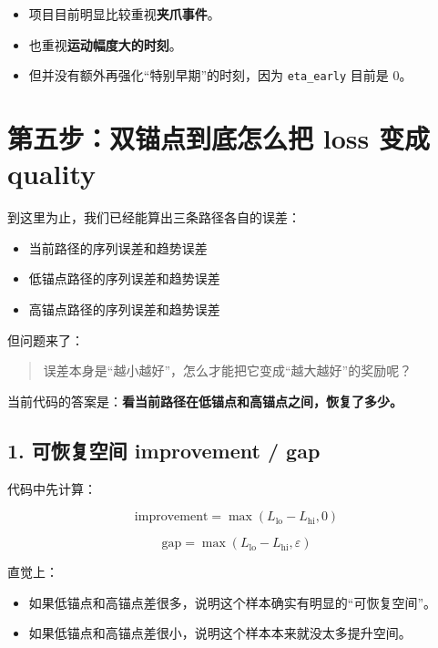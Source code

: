 \documentclass[12pt]{ctexart}
\begin{document}
\begin{itemize}
    \item 项目目前明显比较重视\textbf{夹爪事件}。
    \item 也重视\textbf{运动幅度大的时刻}。
    \item 但并没有额外再强化“特别早期”的时刻，因为 \texttt{eta\_early} 目前是 0。
\end{itemize}

\section{第五步：双锚点到底怎么把 loss 变成 quality}

到这里为止，我们已经能算出三条路径各自的误差：

\begin{itemize}
    \item 当前路径的序列误差和趋势误差
    \item 低锚点路径的序列误差和趋势误差
    \item 高锚点路径的序列误差和趋势误差
\end{itemize}

但问题来了：

\begin{quote}
    误差本身是“越小越好”，怎么才能把它变成“越大越好”的奖励呢？
\end{quote}

当前代码的答案是：\textbf{看当前路径在低锚点和高锚点之间，恢复了多少。}

\subsection{1. 可恢复空间 improvement / gap}

代码中先计算：

\begin{equation}
    \text{improvement} = \max(L_{\text{lo}} - L_{\text{hi}}, 0)
\end{equation}

\begin{equation}
    \text{gap} = \max(L_{\text{lo}} - L_{\text{hi}}, \varepsilon)
\end{equation}

直觉上：

\begin{itemize}
    \item 如果低锚点和高锚点差很多，说明这个样本确实有明显的“可恢复空间”。
    \item 如果低锚点和高锚点差很小，说明这个样本本来就没太多提升空间。
\end{itemize}
\end{document}
